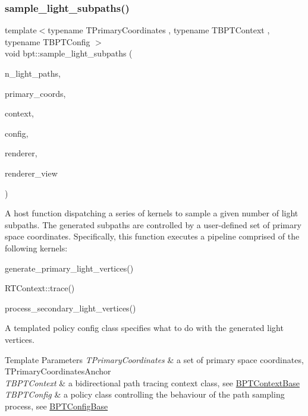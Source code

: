 \subsubsection{\texorpdfstring{sample\+\_\+light\+\_\+subpaths()}{sample\_light\_subpaths()}}
{\footnotesize\ttfamily template$<$typename T\+Primary\+Coordinates , typename T\+B\+P\+T\+Context , typename T\+B\+P\+T\+Config $>$ \\
void bpt\+::sample\+\_\+light\+\_\+subpaths (\begin{DoxyParamCaption}\item[{const uint32}]{n\+\_\+light\+\_\+paths,  }\item[{T\+Primary\+Coordinates}]{primary\+\_\+coords,  }\item[{T\+B\+P\+T\+Context \&}]{context,  }\item[{const T\+B\+P\+T\+Config \&}]{config,  }\item[{\hyperlink{struct_rendering_context}{Rendering\+Context} \&}]{renderer,  }\item[{\hyperlink{struct_rendering_context_view}{Rendering\+Context\+View} \&}]{renderer\+\_\+view }\end{DoxyParamCaption})}

\begin{DoxyParagraph}{}
A host function dispatching a series of kernels to sample a given number of light subpaths. The generated subpaths are controlled by a user-\/defined set of primary space coordinates. Specifically, this function executes a pipeline comprised of the following kernels\+: ~\newline

\begin{DoxyItemize}
\item generate\+\_\+primary\+\_\+light\+\_\+vertices()
\item R\+T\+Context\+::trace()
\item process\+\_\+secondary\+\_\+light\+\_\+vertices() 
\end{DoxyItemize}
\end{DoxyParagraph}
\begin{DoxyParagraph}{}
A templated policy config class specifies what to do with the generated light vertices.
\end{DoxyParagraph}

\begin{DoxyTemplParams}{Template Parameters}
{\em T\+Primary\+Coordinates} & a set of primary space coordinates, T\+Primary\+Coordinates\+Anchor \\
\hline
{\em T\+B\+P\+T\+Context} & a bidirectional path tracing context class, see \hyperlink{struct_b_p_t_context_base}{B\+P\+T\+Context\+Base} \\
\hline
{\em T\+B\+P\+T\+Config} & a policy class controlling the behaviour of the path sampling process, see \hyperlink{struct_b_p_t_config_base}{B\+P\+T\+Config\+Base} \\
\hline
\end{DoxyTemplParams}
\mbox{\label{group___b_p_t_lib_ga4c1164d859ed146eb306e8b7b178c7e7}} 
